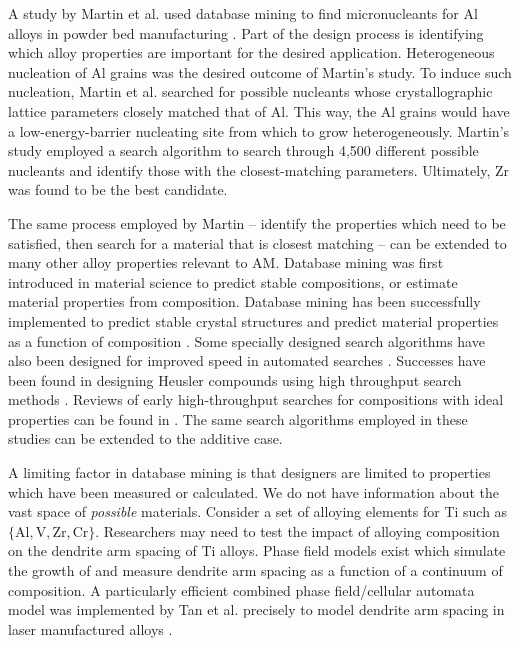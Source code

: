 A study by Martin et al. used database mining to find micronucleants for Al alloys in powder bed manufacturing \cite{Martin2017}. Part of the design process is identifying which alloy properties are important for the desired application. Heterogeneous nucleation of Al grains was the desired outcome of Martin's study. To induce such nucleation, Martin et al. searched for possible nucleants whose crystallographic lattice parameters closely matched that of Al. This way, the Al grains would have a low-energy-barrier nucleating site from which to grow heterogeneously. Martin's study employed a search algorithm to search through 4,500 different possible nucleants and identify those with the closest-matching parameters. Ultimately, Zr was found to be the best candidate.

The same process employed by Martin -- identify the properties which need to be satisfied, then search for a material that is closest matching -- can be extended to many other alloy properties relevant to AM. Database mining was first introduced in material science to predict stable compositions, or estimate material properties from composition. Database mining has been successfully implemented to predict stable crystal structures \cite{Franceschetti1999, Fischer2006, Oganov2006} and predict material properties as a function of composition \cite{Ikeda1997, Gopakumar2018, Wu2018, Kirklin2013, Setyawan2011}. Some specially designed search algorithms have also been designed for improved speed in automated searches \cite{Wolf2000}. Successes have been found in designing Heusler compounds using high throughput search methods \cite{Roy2012}. Reviews of early high-throughput searches for compositions with ideal properties can be found in \cite{Gilmer1998, Koinuma2004}. The same search algorithms employed in these studies can be extended to the additive case.

A limiting factor in database mining is that designers are limited to properties which have been measured or calculated. We do not have information about the vast space of \textit{possible} materials. Consider a set of alloying elements for Ti such as $\{\text{Al}, \text{V}, \text{Zr}, \text{Cr}\}$. Researchers may need to test the impact of alloying composition on the dendrite arm spacing of Ti alloys. Phase field models exist which simulate the growth of and measure dendrite arm spacing as a function of a continuum of composition. A particularly efficient combined phase field/cellular automata model was implemented by Tan et al. precisely to model dendrite arm spacing in laser manufactured alloys \cite{Tan2011}. 

